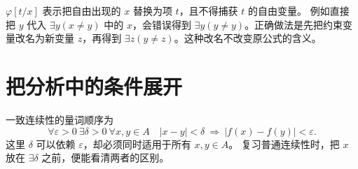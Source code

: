 \(\varphi[t/x]\) 表示把自由出现的 \(x\) 替换为项 \(t\)，且不得捕获 \(t\) 的自由变量。
例如直接把 \(y\) 代入 \(\exists y(x\ne y)\) 中的 \(x\)，会错误得到
\(\exists y(y\ne y)\)。正确做法是先把约束变量改名为新变量 \(z\)，再得到
\(\exists z(y\ne z)\)。这种改名不改变原公式的含义。

\section{把分析中的条件展开}
一致连续性的量词顺序为
\[
\forall\varepsilon>0\ \exists\delta>0\ \forall x,y\in A\quad
 |x-y|<\delta\ \Longrightarrow\ |f(x)-f(y)|<\varepsilon.
\]
这里 \(\delta\) 可以依赖 \(\varepsilon\)，却必须同时适用于所有 \(x,y\in A\)。
复习普通连续性时，把 \(x\) 放在 \(\exists\delta\) 之前，便能看清两者的区别。
